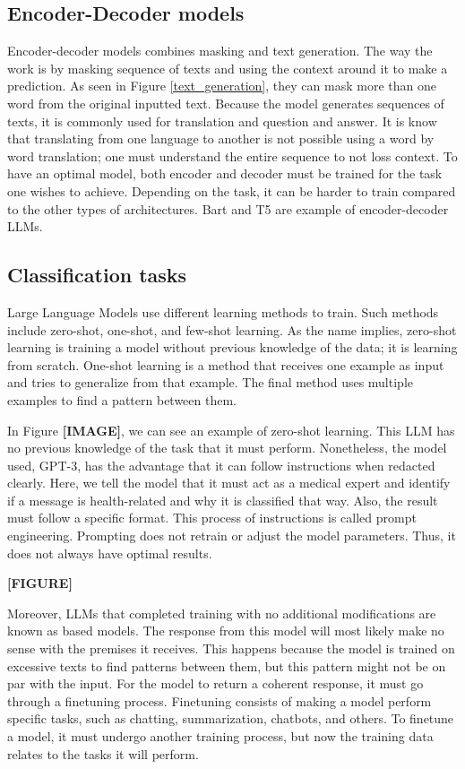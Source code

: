 \subsection{Encoder-Decoder models}
Encoder-decoder models combines masking and text generation. The way the work is by masking sequence of texts and using the context around it to make a prediction. As seen
in Figure \ref{text_generation}, they can mask more than one word from the original inputted text. Because the model generates sequences of texts, it is commonly used for translation
and question and answer. It is know that translating from one language to another is not possible using a word by word translation; one must understand the entire sequence to not loss context.
To have an optimal model, both encoder and decoder must be trained for the task one wishes to achieve. Depending on the task, it can be harder to train compared to the other types of architectures.
Bart \cite{lewis2019bartdenoisingsequencetosequencepretraining} and T5 \cite{chung2022scalinginstructionfinetunedlanguagemodels} are example of encoder-decoder LLMs.


\subsection{Classification tasks}
Large Language Models use different learning methods to train. Such methods include zero-shot, one-shot, and few-shot learning. As the name implies, zero-shot learning is training a model without
previous knowledge of the data; it is learning from scratch. One-shot learning is a method that receives one example as input and tries to generalize from that example. The final method uses
multiple examples to find a pattern between them. 

In Figure \textbf{[IMAGE]}, we can see an example of zero-shot learning. This LLM has no previous knowledge of the task that it must perform. Nonetheless, the model used, GPT-3, has the 
advantage that it can follow instructions when redacted clearly. Here, we tell the model that it must act as a medical expert and identify if a message is health-related and why it is classified that way. 
Also, the result must follow a specific format. This process of instructions is called prompt engineering. Prompting does not retrain or adjust the model parameters. Thus, it does not always have optimal results.  

 \textbf{[FIGURE]}


Moreover, LLMs that completed training with no additional modifications are known as based models. The response from this model will most likely make no sense with the premises it receives.
This happens because the model is trained on excessive texts to find patterns between them, but this pattern might not be on par with the input. For the model to return a coherent response, it must go
through a finetuning process. Finetuning consists of making a model perform specific tasks, such as chatting, summarization, chatbots, and others. To finetune a model, it must undergo another training process, but now the training data relates to the tasks it will perform. 

